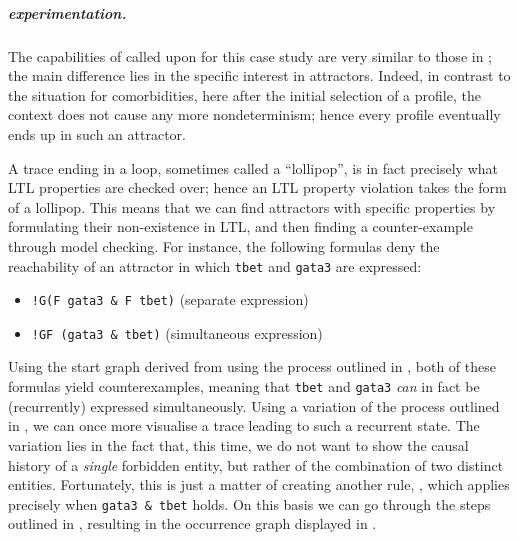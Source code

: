 \subparagraph*{\GROOVE experimentation.}

The capabilities of \GROOVE called upon for this case study are very similar to those in ; the main difference lies in the specific interest in attractors. Indeed, in contrast to the situation for comorbidities, here after the initial selection of a profile, the context does not cause any more nondeterminism; hence every profile eventually ends up in such an attractor.

A trace ending in a loop, sometimes called a ``lollipop'', is in fact precisely what LTL properties are checked over; hence an LTL property violation takes the form of a lollipop. This means that we can find attractors with specific properties by formulating their non-existence in LTL, and then finding a counter-example through model checking. For instance, the following formulas deny the reachability of an attractor in which \texttt{tbet} and \texttt{gata3} are expressed:

\begin{itemize}
\item \verb=!G(F gata3 & F tbet)= (separate expression)
\item \verb=!GF (gata3 & tbet)= (simultaneous expression)
\end{itemize}

Using the start graph derived from \BioResolve using the process outlined in , both of these formulas yield counterexamples, meaning that \texttt{tbet} and \texttt{gata3} \emph{can} in fact be (recurrently) expressed simultaneously. Using a variation of the process outlined in , we can once more visualise a trace leading to such a recurrent state. The variation lies in the fact that, this time, we do not  want to show the causal history of a \emph{single} forbidden entity, but rather of the combination of two distinct entities. Fortunately, this is just a matter of creating another rule, \gatatbet, which applies precisely when \verb=gata3 & tbet= holds. On this basis we can go through the steps outlined in , resulting in the occurrence graph displayed in .

